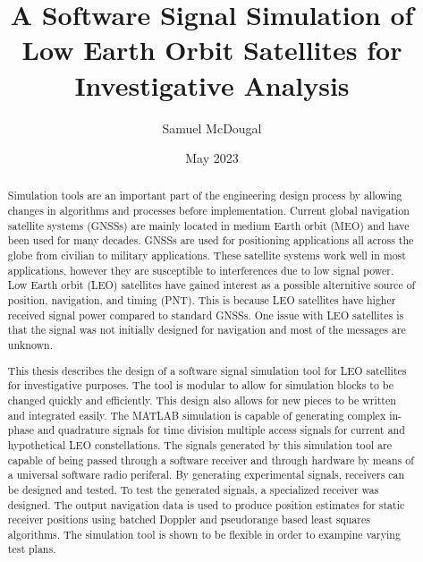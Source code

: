 \documentclass[12pt]{report}
\title{A Software Signal Simulation of Low Earth Orbit Satellites for Investigative Analysis}
\author{Samuel McDougal}
\date{May 2023} %
\begin{document}
\begin{romanpages}      %

\TitlePage 

\begin{abstract} 
Simulation tools are an important part of the engineering design process by allowing changes in algorithms and processes before  implementation. Current global navigation satellite systems (GNSSs) are mainly located in medium Earth orbit (MEO) and have been used for many decades. GNSSs are used for positioning applications all across the globe from civilian to military applications. These satellite systems work well in most applications, however they are susceptible to interferences due to low signal power. Low Earth orbit (LEO) satellites have gained interest as a possible alternitive source of position, navigation, and timing (PNT). This is because LEO satellites have higher received signal power compared to standard GNSSs. One issue with LEO satellites is that the signal was not initially designed for navigation and most of the messages are unknown. 

This thesis describes the design of a software signal simulation tool for LEO satellites for investigative purposes. The tool is modular to allow for simulation blocks to be changed quickly and efficiently. This design also allows for new pieces to be written and integrated easily. The MATLAB simulation is capable of generating complex in-phase and quadrature signals for time division multiple access signals for current and hypothetical LEO constellations. The signals generated by this simulation tool are capable of being passed through a software receiver and through hardware by means of a universal software radio periferal. By generating experimental signals, receivers can be designed and tested. To test the generated signals, a specialized receiver was designed. The output navigation data is used to produce position estimates for static receiver positions using batched Doppler and pseudorange based least squares algorithms. The simulation tool is shown to be flexible in order to exampine varying test plans. 


\end{abstract}


\end{romanpages}
\end{document}

